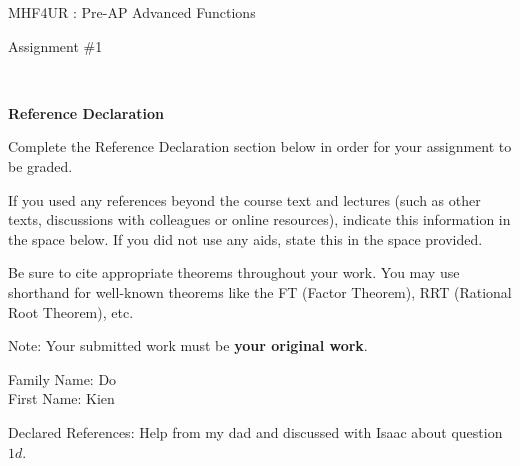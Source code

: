 \documentclass[12pt]{book}
\begin{document}
\vspace{-1.0in}\begin{center}
\Large{MHF4UR : Pre-AP Advanced Functions }

\Large{Assignment \#1}


\end{center}


\vspace{0.015in}\hrulefill\ 

\textbf{Reference Declaration} %

Complete the Reference Declaration section below in order for your assignment to be graded.

If you used any references beyond the course text and lectures (such as other texts, discussions with colleagues or online resources), indicate this information in the space below.  If you did not use any aids, state this in the space provided. 

Be sure to cite appropriate theorems throughout your work. You may use shorthand for well-known theorems like the FT (Factor Theorem), RRT (Rational Root Theorem), etc. 

Note: Your submitted work must be \textbf{your original work}. 

Family Name: Do \\%
First Name: Kien %

Declared References: Help from my dad and discussed with Isaac about question $1d$. 


\vspace{0.015in}\hrulefill\ 

\newpage

\end{document}
